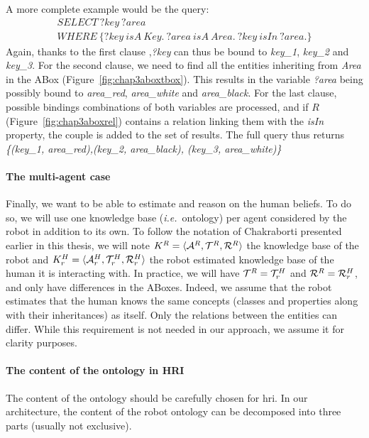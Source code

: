 \documentclass[a4paper,11pt,twoside]{StyleThese}
\begin{document}
A more complete example would be the query:
\begin{multline*}
SELECT \ ?key \ ?area\\
WHERE \ \{?key \ isA \ Key. \ ?area \ isA \ Area. \ ?key\ isIn \ ?area.\}
\end{multline*}
Again, thanks to the first clause ,\textit{?key} can thus be bound to \textit{key\_1}, \textit{key\_2} and \textit{key\_3}. For the second clause, we need to find all the entities inheriting from \textit{Area} in the ABox (Figure~\ref{fig:chap3aboxtbox}). This results in the variable \textit{?area} being possibly bound to \textit{area\_red}, \textit{area\_white} and \textit{area\_black}. For the last clause, possible bindings combinations of both variables are processed, and if $R$ (Figure~\ref{fig:chap3aboxrel}) contains a relation linking them with the \textit{isIn} property, the couple is added to the set of results. The full query thus returns \textit{\{(key\_1, area\_red),(key\_2, area\_black), (key\_3, area\_white)\}}


\paragraph{The multi-agent case}
Finally, we want to be able to estimate and reason on the human beliefs. To do so, we will use one knowledge base (\textit{i.e.}~ontology) per agent considered by the robot in addition to its own. To follow the notation of Chakraborti \cite{chakraborti2018human} presented earlier in this thesis, we will note $K^R = \langle \mathcal{A}^R, \mathcal{T}^R, \mathcal{R}^R \rangle$ the knowledge base of the robot and $K^H_r = \langle \mathcal{A}^H_r, \mathcal{T}^H_r, \mathcal{R}^H_r \rangle$ the robot estimated knowledge base of the human it is interacting with. In practice, we will have $\mathcal{T}^R = \mathcal{T}^H_r$ and $\mathcal{R}^R = \mathcal{R}^H_r$, and only have differences in the ABoxes. Indeed, we assume that the robot estimates that the human knows the same concepts (classes and properties along with their inheritances) as itself. Only the relations between the entities can differ. While this requirement is not needed in our approach, we assume it for clarity purposes.

\paragraph{The content of the ontology in HRI}
The content of the ontology should be carefully chosen for \acrshort{hri}. In our architecture, the content of the robot ontology can be decomposed into three parts (usually not exclusive). 
\end{document}
